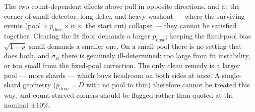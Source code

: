 \documentclass[11pt]{article}
\begin{document}
The two count-dependent effects above pull in opposite directions, and at the
corner of small detector, long delay, and heavy washout --- where the surviving
events (pool $\times\,p_{\mathrm{dose}}\times w\times$ the start cut) collapse ---
they cannot be satisfied together. Clearing the fit floor demands a larger
$p_{\mathrm{dose}}$; keeping the fixed-pool bias $\sqrt{1-p}$ small demands a
smaller one. On a small pool there is no setting that does both, and $\sigma_R$
there is genuinely ill-determined: too large from fit instability, or too small
from the fixed-pool correction. The only clean remedy is a larger pool --- more
shards --- which buys headroom on both sides at once. A single-shard geometry
($p_{\mathrm{dose}}=D$ with no pool to thin) therefore cannot be treated this way,
and count-starved corners should be flagged rather than quoted at the nominal
$\pm10\%$.
\end{document}
